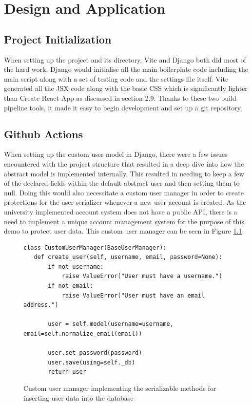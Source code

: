 \chapter{Design and Application}

\section{Project Initialization}

When setting up the project and its directory, Vite and Django both did most of the hard work. Django would initialise all the main boilerplate code including the main script along with a set of testing code and the settings file itself. Vite generated all the JSX code along with the basic CSS which is significantly lighter than Create-React-App as discussed in section 2.9. Thanks to these two build pipeline tools, it made it easy to begin development and set up a git repository.

\section{Github Actions}

When setting up the custom user model in Django, there were a few issues encountered with the project structure that resulted in a deep dive into how the abstract model is implemented internally. This resulted in needing to keep a few of the declared fields within the default abstract user and then setting them to null. Doing this would also necessitate a custom user manager in order to create protections for the user serializer whenever a new user account is created. As the university implemented account system does not have a public API, there is a need to implement a unique account management system for the purpose of this demo to protect user data. This custom user manager can be seen in Figure \ref{fig:abstract_user_manager}.

\pagebreak
\begin{figure}[H]
\begin{verbatim}
class CustomUserManager(BaseUserManager):
   def create_user(self, username, email, password=None):
       if not username:
           raise ValueError("User must have a username.")
       if not email:
           raise ValueError("User must have an email address.")

       user = self.model(username=username, email=self.normalize_email(email))

       user.set_password(password)
       user.save(using=self._db)
       return user
\end{verbatim}
\caption{Custom user manager implementing the serializable methods for inserting user data into the database}
\label{fig:abstract_user_manager}
\end{figure}

